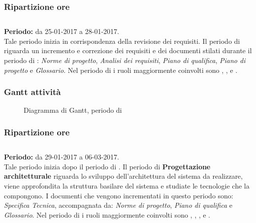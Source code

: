 \subsubsection{Ripartizione ore}
\bgroup
\egroup
  
\subsection{\AD{}}
\textbf{Periodo:} da 25-01-2017 a 28-01-2017. \\
Tale periodo inizia in corrispondenza della revisione dei requisiti. Il periodo di \AD{} riguarda un incremento e correzione dei requisiti e dei documenti stilati durante il periodo di \AR{}: \textit{Norme di progetto}, \textit{Analisi dei requisiti}, \textit{Piano di qualifica}, \textit{Piano di progetto} e \textit{Glossario}.
Nel periodo di \AD{} i ruoli maggiormente coinvolti sono \Analista{}, \Responsabile{}, \Amministratore{} e \Verificatore{}.

\subsubsection{Gantt attività}
\begin{figure}[H]
	\centering
	\caption{Diagramma di Gantt, periodo di \AD{}}
\end{figure}

\subsubsection{Ripartizione ore}
\bgroup
\egroup

\subsection{\PA{}}
\textbf{Periodo:} da 29-01-2017 a 06-03-2017.\\
Tale periodo inizia dopo il periodo di \AD{}. Il periodo di \textbf{Progettazione architetturale} riguarda lo sviluppo dell'architettura del sistema da realizzare, viene approfondita la struttura basilare del sistema e studiate le tecnologie che la compongono. I documenti che vengono incrementati in questo periodo sono: \textit{Specifica Tecnica}, accompagnata da: \textit{Norme di progetto}, \textit{Piano di qualifica} e \textit{Glossario}.
Nel periodo di \PA{} i ruoli maggiormente coinvolti sono \Progettista{}, \Responsabile{}, \Amministratore{}, \Analista{} e \Verificatore{}.
